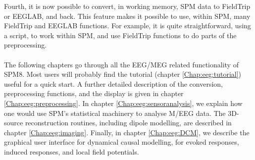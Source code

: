 Fourth, it is now possible to convert, in working memory, SPM data to FieldTrip or EEGLAB, and back. This feature makes it possible to use, within SPM, many FieldTrip and EEGLAB functions. For example, it is quite straightforward, using a script, to work within SPM, and use FieldTrip functions to do parts of the preprocessing.
\\
\\
The following chapters go through all the EEG/MEG related functionality of SPM8. Most users will probably find the tutorial (chapter \ref{Chap:eeg:tutorial}) useful for a quick start. A further detailed description of the conversion, preprocessing functions, and the display is given in chapter \ref{Chap:eeg:preprocessing}. In chapter \ref{Chap:eeg:sensoranalysis}, we explain how one would use SPM's statistical machinery to analyse M/EEG data. The 3D-source reconstruction routines, including dipole modelling, are described in chapter \ref{Chap:eeg:imaging}. Finally, in chapter \ref{Chap:eeg:DCM}, we describe the graphical user interface for dynamical causal modelling, for evoked responses, induced responses, and local field potentials.
